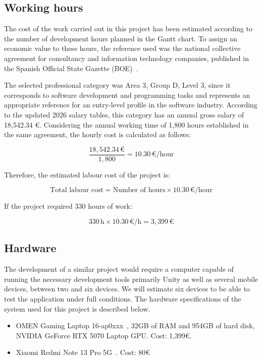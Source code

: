 \subsection{Working hours}
The cost of the work carried out in this project has been estimated according to the number of development hours planned in the Gantt chart.  To assign an economic value to these hours, the reference used was the national collective agreement for consultancy and information technology companies, published in the Spanish Official State Gazette (BOE)~\cite{boe_convenio}.


The selected professional category was Area 3, Group D, Level 3, since it corresponds to software development and programming tasks and represents an appropriate reference for an entry-level profile in the software industry.
According to the updated 2026 salary tables, this category has an annual gross salary of 18,542.34 €. Considering the annual working time of 1,800 hours established in the same agreement, the hourly cost is calculated as follows:


\[
\frac{18{,}542.34\,\text{€}}{1{,}800} = 10.30\,\text{€/hour}
\]

Therefore, the estimated labour cost of the project is: 

\[
\text{Total labour cost} = \text{Number of hours} \times 10.30\,\text{€/hour}
\]

If the project required 330 hours of work: 

 \[
330\,\text{h} \times 10.30\,\text{€/h} = 3,399\,\text{€}
\]

\subsection{Hardware}
The development of a similar project would require a computer capable of running the necessary development tools primarily Unity as well as several mobile devices, between two and six devices. We will estimate six devices to be able to test the application under full conditions. The hardware specifications of the system used for this project is described below.
\begin{itemize}
    \item OMEN Gaming Laptop 16-ap0xxx~\cite{hp_omen}, 32GB of RAM and 954GB of hard disk, NVIDIA GeForce RTX 5070 Laptop GPU. Cost: 1,399€.
    \item Xiaomi Redmi Note 13 Pro 5G~\cite{redmi_note}. Cost: 80€
\end{itemize}


